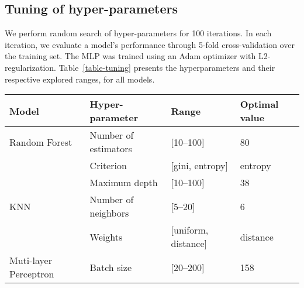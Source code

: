 \documentclass[11pt,a4paper]{article}
\begin{document}
\subsection{Tuning of hyper-parameters}
We perform random search  of hyper-parameters for 100 iterations. In each iteration, we evaluate a model's performance through 5-fold cross-validation over the training set. The MLP was trained using an Adam optimizer \cite{kingma2014adam} with L2-regularization.
Table~\ref{table-tuning} presents the hyperparameters and their respective explored ranges, for all models.


\begin{table*}[]
\centering
\begin{tabular}{|l|l|l|l|}
\hline
Model                 & Hyper-parameter                     & Range                                                                                                                                          & Optimal value \\ \hline
Random Forest         & Number of estimators                & {[}10--100{]}                                                                                                                                   & 80            \\ \cline{2-4} 
                      & Criterion                           & {[}gini, entropy{]}                                                                                                                            & entropy       \\ \cline{2-4} 
                      & Maximum depth                       & {[}10--100{]}                                                                                                                                   & 38            \\ \hline
KNN                   & Number of neighbors                 & {[}5--20{]}                                                                                                                                     & 6             \\ \cline{2-4} 
                      & Weights                             & {[}uniform, distance{]}                                                                                                                        & distance      \\ \hline
Muti-layer Perceptron & Batch size                          & {[}20--200{]}                                                                                                                                   & 158           \\ \cline{2-4} 

\end{tabular}
\end{table*}
\end{document}
